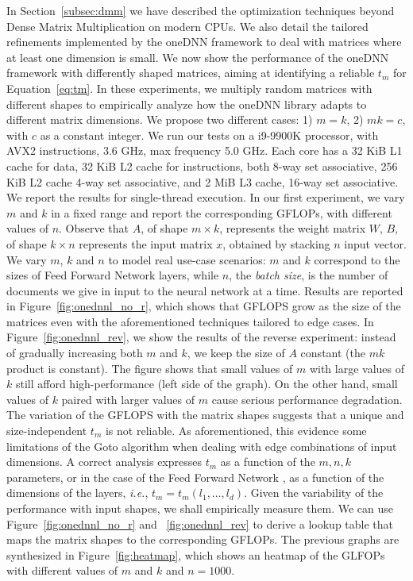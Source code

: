 In Section~\ref{subsec:dmm} we have described the optimization techniques beyond Dense Matrix Multiplication on modern CPUs. We also detail the tailored refinements implemented by the oneDNN framework to deal with matrices where at least one dimension is small. We now show the performance of the oneDNN framework with differently shaped matrices, aiming at identifying a reliable $t_m$ for Equation~\ref{eq:tm}. In these experiments, we multiply random matrices with different shapes to empirically analyze how the oneDNN library adapts to different matrix dimensions. We propose two different cases: 1) $m=k$, 2) $mk=c$, with $c$ as a constant integer.
We run our tests on a i9-9900K processor, with AVX2 instructions, 3.6 GHz, max frequency 5.0 GHz. Each core has a 32 KiB L1 cache for data, 32 KiB L2 cache for instructions, both 8-way set associative, 256 KiB L2 cache 4-way set associative, and 2 MiB L3 cache, 16-way set associative. We report the results for single-thread execution. 
In our first experiment, we vary $m$ and $k$ in a fixed range and report the corresponding GFLOPs, with different values of $n$. Observe that $A$, of shape $m \times k$,  represents the weight matrix $W$, $B$, of shape $k \times n$ represents the input matrix $x$, obtained by stacking $n$ input vector. We vary $m$, $k$ and $n$ to model real use-case scenarios: $m$ and $k$ correspond to the sizes of Feed Forward Network layers, while $n$, the \emph{batch size}, is the number of documents we give in input to the neural network at a time. Results are reported in Figure~\ref{fig:onednnl_no_r}, which shows that GFLOPS grow as the size of the matrices even with the aforementioned techniques tailored to edge cases. In Figure~\ref{fig:onednnl_rev}, we show the results of the reverse experiment: instead of gradually increasing both $m$ and $k$, we keep the size of $A$ constant (the $mk$ product is constant). The figure shows that small values of $m$ with large values of $k$ still afford  high-performance (left side of the graph). On the other hand, small values of $k$ paired with larger values of $m$ cause serious performance degradation. The variation of the GFLOPS with the matrix shapes suggests that a unique and size-independent $t_m$ is not reliable. As aforementioned, this evidence some limitations of the Goto algorithm when dealing with edge combinations of input dimensions.
A correct analysis expresses $t_m$ as a function of the $m,n,k$ parameters, or in the case of the Feed Forward Network , as a function of the dimensions of the layers, \textit{i.e.}, $t_m = t_m( l_1, \dots, l_{d})$.
Given the variability of the performance with input shapes, we shall empirically measure them.
 We can use Figure~\ref{fig:onednnl_no_r} and ~\ref{fig:onednnl_rev} to derive a lookup table that maps the matrix shapes to the corresponding GFLOPs. The previous graphs are synthesized in Figure~\ref{fig:heatmap}, which shows an heatmap of the GLFOPs with different values of $m$ and $k$ and $n = 1000$.


